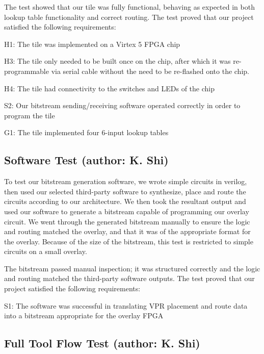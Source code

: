 The test showed that our tile was fully functional, behaving as expected in both lookup table functionality and correct routing.
The test proved that our project satisfied the following requirements:
\begin{itemlist}
	\item H1: The tile was implemented on a Virtex 5 FPGA chip
	\item H3: The tile only needed to be built once on the chip, after which it was re-programmable via serial cable without the need to be re-flashed onto the chip.
	\item H4: The tile had connectivity to the switches and LEDs of the chip
	\item S2: Our bitstream sending/receiving software operated correctly in order to program the tile
	\item G1: The tile implemented four 6-input lookup tables
\end{itemlist}

\subsection{Software Test (author: K. Shi)}

To test our bitstream generation software, we wrote simple circuits in verilog, then used our selected third-party software to synthesize, place and route the circuits according to our architecture.
We then took the resultant output and used our software to generate a bitstream capable of programming our overlay circuit.
We went through the generated bitstream manually to ensure the logic and routing matched the overlay, and that it was of the appropriate format for the overlay.
Because of the size of the bitstream, this test is restricted to simple circuits on a small overlay.

The bitstream passed manual inspection; it was structured correctly and the logic and routing matched the third-party software outputs.
The test proved that our project satisfied the following requirements:
\begin{itemlist}
	\item S1: The software was successful in translating VPR placement and route data into a bitstream appropriate for the overlay FPGA
\end{itemlist}

\subsection{Full Tool Flow Test (author: K. Shi)}

